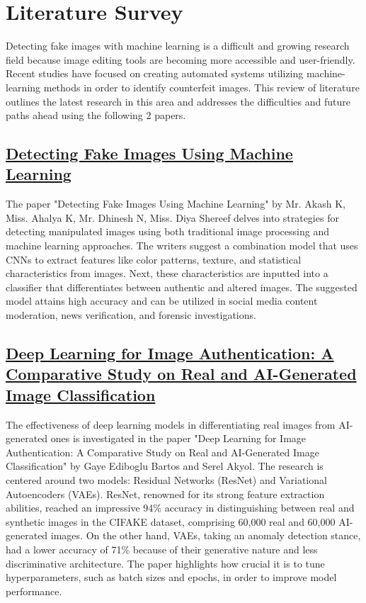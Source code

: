 \documentclass[10pt,twocolumn,letterpaper]{article}
\begin{document}
\section{Literature Survey}
Detecting fake images with machine learning is a difficult and growing research field because image editing tools are becoming more accessible and user-friendly. Recent studies have focused on creating automated systems utilizing machine-learning methods in order to identify counterfeit images. This review of literature outlines the latest research in this area and addresses the difficulties and future paths ahead using the following 2 papers.
\subsection{\href{https://ijrpr.com/uploads/V4ISSUE4/IJRPR11629.pdf}{Detecting Fake Images Using Machine Learning}}
The paper "Detecting Fake Images Using Machine Learning" by Mr. Akash K, Miss. Ahalya K, Mr. Dhinesh N, Miss. Diya Shereef delves into strategies for detecting manipulated images using both traditional image processing and machine learning approaches. The writers suggest a combination model that uses CNNs to extract features like color patterns, texture, and statistical characteristics from images. Next, these characteristics are inputted into a classifier that differentiates between authentic and altered images. The suggested model attains high accuracy and can be utilized in social media content moderation, news verification, and forensic investigations.

\subsection{\href{https://www.researchgate.net/publication/375952278_Deep_Learning_for_Image_Authentication_A_Comparative_Study_on_Real_and_AI-Generated_Image_Classification}{Deep Learning for Image Authentication: A Comparative Study on Real and AI-Generated Image Classification}}
The effectiveness of deep learning models in differentiating real images from AI-generated ones is investigated in the paper "Deep Learning for Image Authentication: A Comparative Study on Real and AI-Generated Image Classification" by Gaye Ediboglu Bartos and Serel Akyol. The research is centered around two models: Residual Networks (ResNet) and Variational Autoencoders (VAEs). ResNet, renowned for its strong feature extraction abilities, reached an impressive 94\% accuracy in distinguishing between real and synthetic images in the CIFAKE dataset, comprising 60,000 real and 60,000 AI-generated images. On the other hand, VAEs, taking an anomaly detection stance, had a lower accuracy of 71\% because of their generative nature and less discriminative architecture. The paper highlights how crucial it is to tune hyperparameters, such as batch sizes and epochs, in order to improve model performance.
\end{document}
